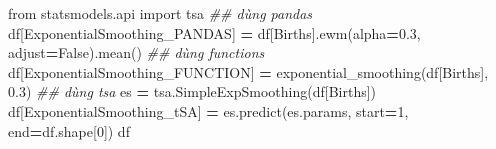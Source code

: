 \documentclass[
]{book}
\newenvironment{Shaded}{\begin{snugshade}}{\end{snugshade}}
\newcommand{\CommentTok}[1]{\textcolor[rgb]{0.56,0.35,0.01}{\textit{#1}}}
\newcommand{\DecValTok}[1]{\textcolor[rgb]{0.00,0.00,0.81}{#1}}
\newcommand{\FloatTok}[1]{\textcolor[rgb]{0.00,0.00,0.81}{#1}}
\newcommand{\ImportTok}[1]{#1}
\newcommand{\NormalTok}[1]{#1}
\newcommand{\OperatorTok}[1]{\textcolor[rgb]{0.81,0.36,0.00}{\textbf{#1}}}
\newcommand{\StringTok}[1]{\textcolor[rgb]{0.31,0.60,0.02}{#1}}
\newcommand{\VariableTok}[1]{\textcolor[rgb]{0.00,0.00,0.00}{#1}}
\begin{document}
\begin{Shaded}
\begin{Highlighting}[]
\ImportTok{from}\NormalTok{ statsmodels.api }\ImportTok{import}\NormalTok{ tsa}
\CommentTok{\#\# dùng pandas}
\NormalTok{df[}\StringTok{\textquotesingle{}ExponentialSmoothing\_PANDAS\textquotesingle{}}\NormalTok{] }\OperatorTok{=}\NormalTok{ df[}\StringTok{\textquotesingle{}Births\textquotesingle{}}\NormalTok{].ewm(alpha}\OperatorTok{=}\FloatTok{0.3}\NormalTok{, adjust}\OperatorTok{=}\VariableTok{False}\NormalTok{).mean()}
\CommentTok{\#\# dùng functions}
\NormalTok{df[}\StringTok{\textquotesingle{}ExponentialSmoothing\_FUNCTION\textquotesingle{}}\NormalTok{] }\OperatorTok{=}\NormalTok{ exponential\_smoothing(df[}\StringTok{\textquotesingle{}Births\textquotesingle{}}\NormalTok{], }\FloatTok{0.3}\NormalTok{)}
\CommentTok{\#\# dùng tsa}
\NormalTok{es }\OperatorTok{=}\NormalTok{ tsa.SimpleExpSmoothing(df[}\StringTok{\textquotesingle{}Births\textquotesingle{}}\NormalTok{])}
\NormalTok{df[}\StringTok{\textquotesingle{}ExponentialSmoothing\_tSA\textquotesingle{}}\NormalTok{] }\OperatorTok{=}\NormalTok{ es.predict(es.params, start}\OperatorTok{=}\DecValTok{1}\NormalTok{, end}\OperatorTok{=}\NormalTok{df.shape[}\DecValTok{0}\NormalTok{])}
\NormalTok{df}
\end{Highlighting}
\end{Shaded}
\end{document}
